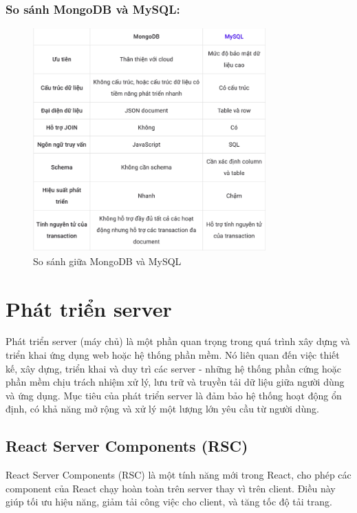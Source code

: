 \subsubsection{So sánh MongoDB và MySQL:}
\begin{figure}[H]
    \centering
    \includegraphics[width=0.8\textwidth]{img/MongoDB_MySQL_comparision.png}
    \caption{So sánh giữa MongoDB và MySQL}
    \label{fig:mongodb_mysql_comparison}
\end{figure}

\section{Phát triển server}
Phát triển server  (máy chủ) là một phần quan trọng trong quá trình xây dựng và triển khai ứng dụng web hoặc hệ thống phần mềm. Nó liên quan đến việc thiết kế, xây dựng, triển khai và duy trì các server - những hệ thống phần cứng hoặc phần mềm chịu trách nhiệm xử lý, lưu trữ và truyền tải dữ liệu giữa người dùng và ứng dụng. Mục tiêu của phát triển server là đảm bảo hệ thống hoạt động ổn định, có khả năng mở rộng và xử lý một lượng lớn yêu cầu từ người dùng.

\subsection{React Server Components (RSC)}
React Server Components (RSC) là một tính năng mới trong React, cho phép các component của React chạy hoàn toàn trên server thay vì trên client. Điều này giúp tối ưu hiệu năng, giảm tải công việc cho client, và tăng tốc độ tải trang.

